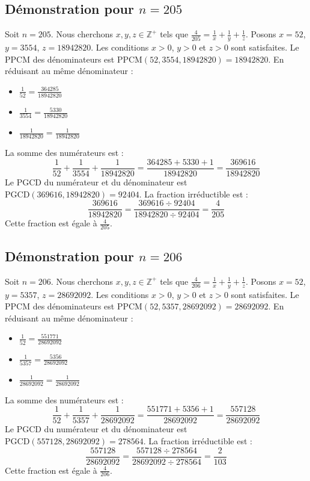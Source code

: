 \documentclass[11pt,a4paper]{article}
\begin{document}
\subsection{Démonstration pour $n = 205$}
Soit $n = 205$. Nous cherchons $x, y, z \in \mathbb{Z}^{+}$ tels que $\frac{4}{205} = \frac{1}{x} + \frac{1}{y} + \frac{1}{z}$.
Posons $x = 52$, $y = 3554$, $z = 18942820$.
Les conditions $x > 0$, $y > 0$ et $z > 0$ sont satisfaites.
Le PPCM des dénominateurs est $\text{PPCM}(52, 3554, 18942820) = 18942820$.
En réduisant au même dénominateur :
\begin{itemize}
    \item $\frac{1}{52} = \frac{364285}{18942820}$
    \item $\frac{1}{3554} = \frac{5330}{18942820}$
    \item $\frac{1}{18942820} = \frac{1}{18942820}$
\end{itemize}
La somme des numérateurs est :
$$ \frac{1}{52} + \frac{1}{3554} + \frac{1}{18942820} = \frac{364285 + 5330 + 1}{18942820} = \frac{369616}{18942820} $$
Le PGCD du numérateur et du dénominateur est $\text{PGCD}(369616, 18942820) = 92404$.
La fraction irréductible est :
$$ \frac{369616}{18942820} = \frac{369616 \div 92404}{18942820 \div 92404} = \frac{4}{205} $$
Cette fraction est égale à $\frac{4}{205}$.

\subsection{Démonstration pour $n = 206$}
Soit $n = 206$. Nous cherchons $x, y, z \in \mathbb{Z}^{+}$ tels que $\frac{4}{206} = \frac{1}{x} + \frac{1}{y} + \frac{1}{z}$.
Posons $x = 52$, $y = 5357$, $z = 28692092$.
Les conditions $x > 0$, $y > 0$ et $z > 0$ sont satisfaites.
Le PPCM des dénominateurs est $\text{PPCM}(52, 5357, 28692092) = 28692092$.
En réduisant au même dénominateur :
\begin{itemize}
    \item $\frac{1}{52} = \frac{551771}{28692092}$
    \item $\frac{1}{5357} = \frac{5356}{28692092}$
    \item $\frac{1}{28692092} = \frac{1}{28692092}$
\end{itemize}
La somme des numérateurs est :
$$ \frac{1}{52} + \frac{1}{5357} + \frac{1}{28692092} = \frac{551771 + 5356 + 1}{28692092} = \frac{557128}{28692092} $$
Le PGCD du numérateur et du dénominateur est $\text{PGCD}(557128, 28692092) = 278564$.
La fraction irréductible est :
$$ \frac{557128}{28692092} = \frac{557128 \div 278564}{28692092 \div 278564} = \frac{2}{103} $$
Cette fraction est égale à $\frac{4}{206}$.
\end{document}
